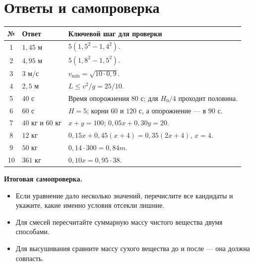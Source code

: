 \documentclass[a4paper,12pt]{article}
\newcommand{\important}[1]{\textcolor{deepaccent}{\textbf{#1}}}
\newcommand{\sectiontitle}[1]{\needspace{6\baselineskip}\section*{\color{deepaccent}#1}}
\begin{document}
\clearpage
\sectiontitle{Ответы и самопроверка}
\renewcommand{\arraystretch}{1.43}
\begin{tabularx}{\linewidth}{@{}c>{\raggedright\arraybackslash}p{29mm}X@{}}
\toprule
№ & Ответ & Ключевой шаг для проверки\\
\midrule
1 & \(1{,}45\) м & \(5(1{,}5^2-1{,}4^2)\).\\
2 & \(4{,}95\) м & \(5(1{,}8^2-1{,}5^2)\).\\
3 & \(3\) м/с & \(v_{\min}=\sqrt{10\cdot0{,}9}\).\\
4 & \(2{,}5\) м & \(L\le v^2/g=25/10\).\\
5 & \(40\) с & Время опорожнения \(80\) с; для \(H_0/4\) проходит половина.\\
6 & \(60\) с & \(H=5\); корни \(60\) и \(120\) с, а опорожнение --- в \(90\) с.\\
7 & \(40\) кг и \(60\) кг & \(x+y=100\); \(0{,}05x+0{,}30y=20\).\\
8 & \(12\) кг & \(0{,}15x+0{,}45(x+4)=0{,}35(2x+4)\), \(x=4\).\\
9 & \(50\) кг & \(0{,}14\cdot300=0{,}84m\).\\
10 & \(361\) кг & \(0{,}10x=0{,}95\cdot38\).\\
\bottomrule
\end{tabularx}

\bigskip
\important{Итоговая самопроверка.}
\begin{itemize}
\item Если уравнение дало несколько значений, перечислите все кандидаты и укажите, какие именно условия отсекли лишние.
\item Для смесей пересчитайте суммарную массу чистого вещества двумя способами.
\item Для высушивания сравните массу сухого вещества до и после --- она должна совпасть.
\end{itemize}
\end{document}
